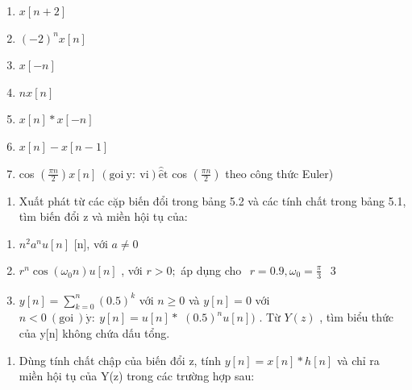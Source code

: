\documentclass[
  10
]{article}
\providecommand{\tightlist}{%
  \setlength{\itemsep}{0pt}\setlength{\parskip}{0pt}}
\begin{document}
\begin{enumerate}
\def\labelenumi{(\alph{enumi})}
\item
  \(x [ n + 2 ]\)
\item
  \(( - 2 ) ^ { n } x [ n ]\)
\item
  \(x [ - n ]\)
\item
  \(n x [ n ]\)
\item
  \(x [ n ] * x [ - n ]\)
\item
  \(x [ n ] - x [ n - 1 ]\)
\item
  cos
  \(\left( { \frac { \pi n } { 2 } } \right) x [ n ] { \mathrm { ~ ( g o i ~ y : ~ v i ) } } { \hat { \hat { \mathrm { e } } } } \mathrm { t }\)
  cos \(\textstyle \left( { \frac { \pi n } { 2 } } \right)\) theo công
  thức Euler)
\end{enumerate}

\begin{enumerate}
\def\labelenumi{\arabic{enumi}.}
\setcounter{enumi}{5}
\tightlist
\item
  Xuất phát từ các cặp biến đổi trong bảng 5.2 và các tính chất trong
  bảng 5.1, tìm biến đổi z và miền hội tụ của:
\end{enumerate}

\begin{enumerate}
\def\labelenumi{(\alph{enumi})}
\item
  \(n ^ { 2 } a ^ { n } u [ n ]\) {[}n{]}, với \(a \neq 0\)
\item
  \(r ^ { n } \cos ( \omega _ { 0 } n ) u [ n ]\) , với \(r > 0 ;\) áp
  dụng cho
  \(\begin{array} { r } { r = 0 . 9 , \omega _ { 0 } = \frac { \pi } { 3 } } \end{array}\)
  3
\item
  \(\textstyle y [ n ] = \sum _ { k = 0 } ^ { n } ( 0 . 5 ) ^ { k }\)
  với \(n \geq 0\) và \(y [ n ] = 0\) với
  \(n < 0 \mathrm { ~ ( g o i ~ ) } \dot { \mathrm { y } } \mathrm { : ~ } y [ n ] = u [ n ] *\)
  \(( 0 . 5 ) ^ { n } u [ n ] )\) . Từ \(Y ( z )\) , tìm biểu thức của
  y{[}n{]} không chứa dấu tổng.
\end{enumerate}

\begin{enumerate}
\def\labelenumi{\arabic{enumi}.}
\setcounter{enumi}{6}
\tightlist
\item
  Dùng tính chất chập của biến đổi z, tính
  \(y [ n ] = x [ n ] * h [ n ]\) và chỉ ra miền hội tụ của Y(z) trong
  các trường hợp sau:
\end{enumerate}
\end{document}
